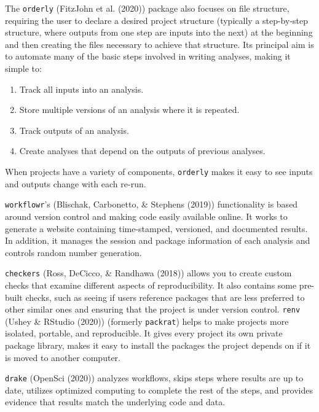 \documentclass[12pt,twoside]{reedthesis}
\providecommand{\tightlist}{%
  \setlength{\itemsep}{0pt}\setlength{\parskip}{0pt}}
\begin{document}
The \texttt{orderly} (FitzJohn et al. (2020)) package also focuses on
file structure, requiring the user to declare a desired project
structure (typically a step-by-step structure, where outputs from one
step are inputs into the next) at the beginning and then creating the
files necessary to achieve that structure. Its principal aim is to
automate many of the basic steps involved in writing analyses, making it
simple to:
\begin{enumerate}
\def\labelenumi{\arabic{enumi})}
\tightlist
\item
  Track all inputs into an analysis.
\item
  Store multiple versions of an analysis where it is repeated.
\item
  Track outputs of an analysis.
\item
  Create analyses that depend on the outputs of previous analyses.
\end{enumerate}
When projects have a variety of components, \texttt{orderly} makes it
easy to see inputs and outputs change with each re-run.

\texttt{workflowr}'s (Blischak, Carbonetto, \& Stephens (2019))
functionality is based around version control and making code easily
available online. It works to generate a website containing
time-stamped, versioned, and documented results. In addition, it manages
the session and package information of each analysis and controls random
number generation.

\texttt{checkers} (Ross, DeCicco, \& Randhawa (2018)) allows you to
create custom checks that examine different aspects of reproducibility.
It also contains some pre-built checks, such as seeing if users
reference packages that are less preferred to other similar ones and
ensuring that the project is under version control. \texttt{renv} (Ushey
\& RStudio (2020)) (formerly \texttt{packrat}) helps to make projects
more isolated, portable, and reproducible. It gives every project its
own private package library, makes it easy to install the packages the
project depends on if it is moved to another computer.

\texttt{drake} (OpenSci (2020)) analyzes workflows, skips steps where
results are up to date, utilizes optimized computing to complete the
rest of the steps, and provides evidence that results match the
underlying code and data.
\end{document}
